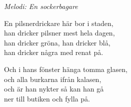 {\footnotesize\textit{Melodi: En sockerbagare}}\par
\vspace{10pt}
En pilsnerdrickare här bor i staden,\\
han dricker pilsner mest hela dagen,\\
han dricker gröna, han dricker blå,\\
han dricker några med renat på.\par
\vspace{10pt}
Och i hans fönster hänga tomma glasen,\\
och alla burkarna ifrån kalasen,\\
och är han nykter så kan han gå\\
ner till butiken och fylla på.

